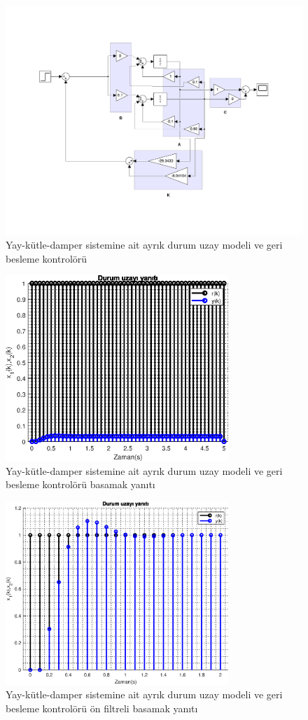 \begin{figure}[!htb]
    \centering
    \includegraphics[width=\textwidth]{img/lec12_model1}
    \caption{Yay-kütle-damper sistemine ait ayrık durum uzay modeli ve geri besleme kontrolörü}
    \label{fig:lec12_model1}
\end{figure}


\begin{figure}[!htb]
    \centering
    \includegraphics[width=0.75\textwidth]{img/lec12_plot1}
    \caption{Yay-kütle-damper sistemine ait ayrık durum uzay modeli ve geri besleme kontrolörü basamak yanıtı}
    \label{fig:lec12_plot1}
\end{figure}

\begin{figure}[!htb]
    \centering
    \includegraphics[width=0.75\textwidth]{img/lec12_plot2}
    \caption{Yay-kütle-damper sistemine ait ayrık durum uzay modeli ve geri besleme kontrolörü ön filtreli basamak yanıtı}
    \label{fig:lec12_plot2}
\end{figure}


